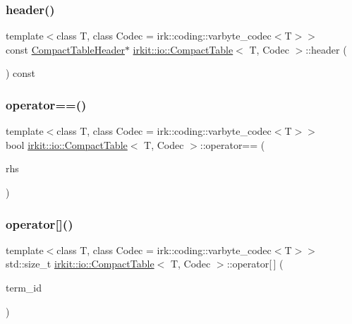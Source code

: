 \subsubsection{\texorpdfstring{header()}{header()}}
{\footnotesize\ttfamily template$<$class T, class Codec = irk\+::coding\+::varbyte\+\_\+codec$<$\+T$>$$>$ \\
const \mbox{\hyperlink{structirkit_1_1io_1_1CompactTableHeader}{Compact\+Table\+Header}}$\ast$ \mbox{\hyperlink{classirkit_1_1io_1_1CompactTable}{irkit\+::io\+::\+Compact\+Table}}$<$ T, Codec $>$\+::header (\begin{DoxyParamCaption}{ }\end{DoxyParamCaption}) const\hspace{0.3cm}{\ttfamily [inline]}}

\mbox{\label{classirkit_1_1io_1_1CompactTable_a2daba70550b6119d1ef13ae24afbe194}} 
\subsubsection{\texorpdfstring{operator==()}{operator==()}}
{\footnotesize\ttfamily template$<$class T, class Codec = irk\+::coding\+::varbyte\+\_\+codec$<$\+T$>$$>$ \\
bool \mbox{\hyperlink{classirkit_1_1io_1_1CompactTable}{irkit\+::io\+::\+Compact\+Table}}$<$ T, Codec $>$\+::operator== (\begin{DoxyParamCaption}\item[{const \mbox{\hyperlink{classirkit_1_1io_1_1CompactTable}{Compact\+Table}}$<$ T, Codec $>$ \&}]{rhs }\end{DoxyParamCaption})\hspace{0.3cm}{\ttfamily [inline]}}

\mbox{\label{classirkit_1_1io_1_1CompactTable_a040c59b950270efb9a6e329dd38554ca}} 
\subsubsection{\texorpdfstring{operator[]()}{operator[]()}\hspace{0.1cm}{\footnotesize\ttfamily [1/2]}}
{\footnotesize\ttfamily template$<$class T, class Codec = irk\+::coding\+::varbyte\+\_\+codec$<$\+T$>$$>$ \\
std\+::size\+\_\+t \mbox{\hyperlink{classirkit_1_1io_1_1CompactTable}{irkit\+::io\+::\+Compact\+Table}}$<$ T, Codec $>$\+::operator\mbox{[}$\,$\mbox{]} (\begin{DoxyParamCaption}\item[{std\+::size\+\_\+t}]{term\+\_\+id }\end{DoxyParamCaption})\hspace{0.3cm}{\ttfamily [inline]}}

